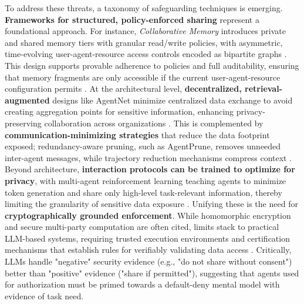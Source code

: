 \documentclass[11pt,a4paper]{article}
\begin{document}
To address these threats, a taxonomy of safeguarding techniques is emerging. \textbf{Frameworks for structured, policy-enforced sharing} represent a foundational approach. For instance, \emph{Collaborative Memory} introduces private and shared memory tiers with granular read/write policies, with asymmetric, time-evolving user-agent-resource access controls encoded as bipartite graphs \cite{arxiv:2505.18279v1}. This design supports provable adherence to policies and full auditability, ensuring that memory fragments are only accessible if the current user-agent-resource configuration permits \cite{arxiv:2505.18279v1}. At the architectural level, \textbf{decentralized, retrieval-augmented} designs like AgentNet minimize centralized data exchange to avoid creating aggregation points for sensitive information, enhancing privacy-preserving collaboration across organizations \cite{arxiv:2504.00587v2}. This is complemented by \textbf{communication-minimizing strategies} that reduce the data footprint exposed; redundancy-aware pruning, such as AgentPrune, removes unneeded inter-agent messages, while trajectory reduction mechanisms compress context \cite{arxiv:2410.02506v1,arxiv:2509.23586v2}. Beyond architecture, \textbf{interaction protocols can be trained to optimize for privacy}, with multi-agent reinforcement learning teaching agents to minimize token generation and share only high-level task-relevant information, thereby limiting the granularity of sensitive data exposure \cite{arxiv:2410.08115v2}. Unifying these is the need for \textbf{cryptographically grounded enforcement}. While homomorphic encryption and secure multi-party computation are often cited, limits stack to practical LLM-based systems, requiring trusted execution environments and certification mechanisms that establish rules for verifiably validating data access \cite{arxiv:2505.23847v5}. Critically, LLMs handle "negative" security evidence (e.g., "do not share without consent") better than "positive" evidence ("share if permitted"), suggesting that agents used for authorization must be primed towards a default-deny mental model with evidence of task need.
\end{document}
